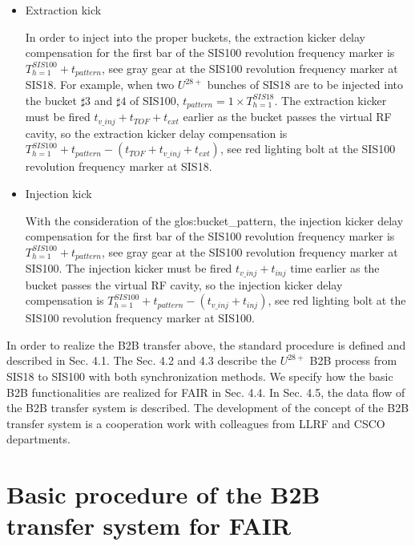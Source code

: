 \begin{itemize}
\item Extraction kick

In order to inject into the proper buckets, the extraction kicker delay compensation for the first bar of the SIS100 revolution frequency marker is $T_{h=1}^{SIS100} + t_{pattern}$, see gray gear at the SIS100 revolution frequency marker at SIS18. For example, when two $U^{28+}$ bunches of SIS18 are to be injected into the bucket $\sharp3$ and $\sharp4$ of SIS100, $t_{pattern} =1 \times T_{h=1}^{SIS18}$. The extraction kicker must be fired $t_{v\_inj}+t_{TOF}+t_{ext}$ earlier as the bucket passes the virtual RF cavity, so the extraction kicker delay compensation is $T_{h=1}^{SIS100} + t_{pattern} - (t_{TOF} + t_{v\_inj} + t_{ext})$, see red lighting bolt at the SIS100 revolution frequency marker at SIS18. 

\item Injection kick

With the consideration of the \gls{glos:bucket_pattern}, the injection kicker delay compensation for the first bar of the SIS100 revolution frequency marker is $T_{h=1}^{SIS100} + t_{pattern}$, see gray gear at the SIS100 revolution frequency marker at SIS100. The injection kicker must be fired $t_{v\_inj}+t_{inj}$ time earlier as the bucket passes the virtual RF cavity, so the injection kicker delay compensation is $T_{h=1}^{SIS100} + t_{pattern} - (t_{v\_inj} + t_{inj})$, see red lighting bolt at the SIS100 revolution frequency marker at SIS100.
\end{itemize}

In order to realize the B2B transfer above, the standard procedure is defined and described in Sec. 4.1. The Sec. 4.2 and 4.3 describe the $U^{28+}$ B2B process from SIS18 to SIS100 with both synchronization methods. We specify how the basic B2B functionalities are realized for FAIR in Sec. 4.4. In Sec. 4.5, the data flow of the B2B transfer system is described. The development of the concept of the B2B transfer system is a cooperation work with colleagues from LLRF and \gls{CSCO} departments. 
\section{Basic procedure of the B2B transfer system for FAIR}

